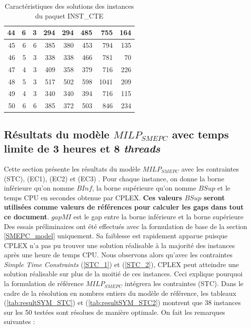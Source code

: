 {\begin{table}[H]
{\begin{tabular}{|r|r|r|r|r|r|r|r|}
			44	&	6	&	3	&	294	&	294	&	485	&	755	&	164	\\ \hline
			45	&	6	&	6	&	385	&	380	&	453	&	794	&	135	\\ \hline
			46	&	5	&	3	&	338	&	338	&	466	&	781	&	70	\\ \hline
			47	&	4	&	3	&	409	&	358	&	379	&	716	&	226	\\ \hline
			48	&	5	&	3	&	517	&	502	&	598	&	1041	&	209	\\ \hline
			49	&	4	&	3	&	340	&	340	&	394	&	716	&	115	\\ \hline
			50	&	6	&	6	&	385	&	372	&	503	&	846	&	234	\\ \hline
			
			
			
			\bottomrule
		\end{tabular}%
	}\caption{Caractéristiques des solutions des instances du paquet INST\_CTE}
	\label{tab:sol2}%
\end{table}%

\subsection{Résultats du modèle $MILP_{SMEPC}$ avec temps limite de 3 heures et 8 \textit{threads}}
Cette section présente les résultats du modèle $MILP_{SMEPC}$ avec les contraintes (STC), (EC1), (EC2) et (EC3) . %
 Pour chaque instance, on donne la borne inférieure qu'on nomme $BInf$, la borne supérieure qu'on nomme $BSup$ et le temps CPU en secondes obtenue par CPLEX. \textbf{Ces valeurs $BSup$ seront utilisées comme valeurs de références pour calculer les gaps dans tout ce document}. $gapMI$ est le gap entre la borne inférieure et la borne supérieure %
Des essais préliminaires ont été effectués avec la formulation de base de la section \ref{SMEPC_model} uniquement.  Sa faiblesse est rapidement apparue puisque CPLEX n'a pas pu trouver une solution réalisable à la majorité des instances après une heure de temps CPU. Nous observons alors qu'avec les contraintes \textit{Simple Time Constraints} (\ref{STC_1})	et (\ref{STC_2}), CPLEX peut atteindre une solution réalisable sur plus de la moitié de ces instances. Ceci explique pourquoi la formulation de référence $MILP_{SMEPC}$ intégrera les contraintes (STC).
Dans le cadre de la résolution en nombres entiers du modèle de référence, les tableaux (\ref{tab:resultSYM_STC}) et (\ref{tab:resultSYM_STC2}) montrent que 38 instances sur les 50 testées sont résolues de manière optimale. %
On fait les remarques suivantes :
\begin{itemize}[label=$\square$]
	

\end{itemize}}

